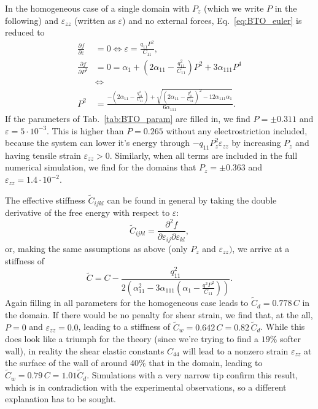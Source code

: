 In the homogeneous case of a single domain with $P_z$ (which we write $P$ in the following) and $\varepsilon_{zz}$ (written as $\varepsilon$) and no external forces, Eq.~\ref{eq:BTO_euler} is reduced to  
\begin{align}
	\frac{\partial f}{\partial \varepsilon} &= 0 \Leftrightarrow \varepsilon = \frac{q_{11}P^2}{C_{11}}\label{eq:BTO_e0},\\
	\frac{\partial f}{\partial P^2} &= 0 = \alpha_1 + (2 \alpha_{11} - \frac{q_{11}^2}{C_{11}})P^2 + 3\alpha_{111}P^4 \\
	& \Leftrightarrow \\
	P^2 &= \frac{-(2\alpha_{11} - \frac{q_{11}^2}{C_{11}}) + \sqrt{(2\alpha_{11}-\frac{q_{11}^2}{C_{11}})^2 - 12 \alpha_{111} \alpha_1}}{6\alpha_{111}}.
\end{align}
If the parameters of Tab.~\ref{tab:BTO_param} are filled in, we find $P = \pm 0.311$ and $\varepsilon = 5 \cdot 10^{-3}$.
This is higher than $P = 0.265$ \cite{Marton2010} without any electrostriction included, because the system can lower it's energy through $-q_{11}P_z^2\varepsilon_{zz}$ by increasing $P_z$ and having tensile strain $\varepsilon_{zz} > 0$.
Similarly, when all terms are included in the full numerical simulation, we find for the domains that $P_z = \pm 0.363$ and $\varepsilon_{zz} = 1.4 \cdot 10^{-2}$.

The effective stiffness $\tilde{C}_{ijkl}$ can be found in general by taking the double derivative of the free energy with respect to $\varepsilon$:
\begin{equation}
	\tilde{C}_{ijkl} = \frac{\partial^2 f}{\partial \varepsilon_{ij} \partial \varepsilon_{kl}},
\end{equation}
or, making the same assumptions as above (only $P_z$ and $\varepsilon_{zz})$, we arrive at a stiffness of
\begin{equation}
	\tilde{C} = C - \frac{q_{11}^2}{2\left(\alpha_{11}^2 - 3 \alpha_{111}\left(\alpha_1  - \frac{q^2 P^2}{C_{11}}\right)\right)}\label{eq:BTO_domainC}.
\end{equation}
Again filling in all parameters for the homogeneous case leads to $\tilde{C}_d = 0.778 \,C$ in the domain.
If there would be no penalty for shear strain, we find that, at the all, $P = 0$ and $\varepsilon_{zz} = 0.0$, leading to a stiffness of $\tilde{C}_w = 0.642 \, C = 0.82\, \tilde{C}_d$.
While this does look like a triumph for the theory (since we're trying to find a $19\%$ softer wall), in reality the shear elastic constants $C_{44}$  will lead to a nonzero strain $\varepsilon_{zz}$ at the surface of the wall of around $40\%$ that in the domain, leading to $\tilde{C}_w = 0.79 \, C = 1.01 \tilde{C}_d$.
Simulations with a very narrow tip confirm this result, which is in contradiction with the experimental observations, so a different explanation has to be sought.

